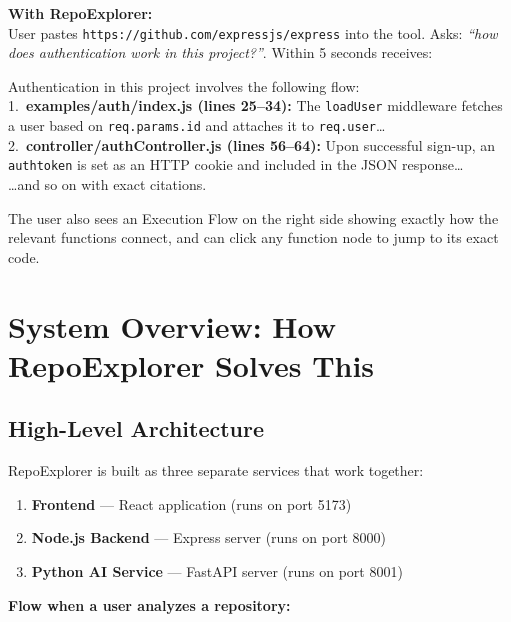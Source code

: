 \documentclass[a4paper,11pt]{article}
\begin{document}
\vspace{6pt}
\textbf{With RepoExplorer:}\\
User pastes \texttt{https://github.com/expressjs/express} into the tool. Asks: \textit{``how does authentication work in this project?''}. Within 5 seconds receives:

\begin{mdframed}[style=notebox]
Authentication in this project involves the following flow:\\[4pt]
1.\ \textbf{examples/auth/index.js (lines 25--34):} The \texttt{loadUser} middleware fetches a user based on \texttt{req.params.id} and attaches it to \texttt{req.user}\ldots\\[2pt]
2.\ \textbf{controller/authController.js (lines 56--64):} Upon successful sign-up, an \texttt{authtoken} is set as an HTTP cookie and included in the JSON response\ldots\\[2pt]
\ldots and so on with exact citations.
\end{mdframed}

The user also sees an Execution Flow on the right side showing exactly how the relevant functions connect, and can click any function node to jump to its exact code.

\newpage

\section{System Overview: How RepoExplorer Solves This}

\subsection{High-Level Architecture}

RepoExplorer is built as three separate services that work together:

\begin{enumerate}
    \item \textbf{Frontend} --- React application (runs on port 5173)
    \item \textbf{Node.js Backend} --- Express server (runs on port 8000)
    \item \textbf{Python AI Service} --- FastAPI server (runs on port 8001)
\end{enumerate}

\noindent\textbf{Flow when a user analyzes a repository:}
\end{document}
